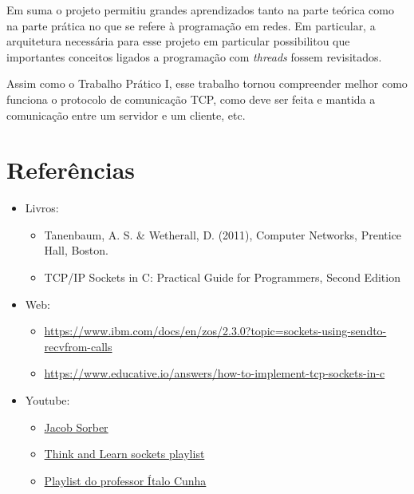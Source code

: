 \documentclass{article}
\begin{document}
Em suma o projeto permitiu grandes aprendizados tanto na parte teórica como na
parte prática no que se refere à programação em redes. Em particular, a
arquitetura necessária para esse projeto em particular possibilitou que
importantes conceitos ligados a programação com \textit{threads} fossem
revisitados.

Assim como o Trabalho Prático I, esse trabalho tornou compreender melhor como
funciona o protocolo de comunicação TCP, como
deve ser feita e mantida a comunicação entre um servidor e um cliente, etc.

\section{Referências}

\begin{itemize}
      \item Livros:
            \begin{itemize}
                  \item Tanenbaum, A. S. \& Wetherall, D. (2011), Computer
                        Networks, Prentice Hall, Boston.
                  \item TCP/IP Sockets in C\@: Practical Guide for Programmers,
                        Second Edition
            \end{itemize}

      \item Web:
            \begin{itemize}
                  \item
                        \url{https://www.ibm.com/docs/en/zos/2.3.0?topic=sockets-using-sendto-recvfrom-calls}
                  \item

                        \url{https://www.educative.io/answers/how-to-implement-tcp-sockets-in-c}

            \end{itemize}

      \item Youtube:
            \begin{itemize}
                  \item \href{https://www.youtube.com/@JacobSorber}{Jacob
                              Sorber}
                  \item

                        \href{https://www.youtube.com/watch?v=_lQ-3S4fJ0U&list=PLPyaR5G9aNDvs6TtdpLcVO43_jvxp4emI}{Think
                              and Learn sockets playlist}
                  \item

                        \href{https://www.youtube.com/watch?v=tJ3qNtv0HVs&t=2s}{Playlist do professor
                              Ítalo Cunha}
            \end{itemize}

\end{itemize}
\end{document}
